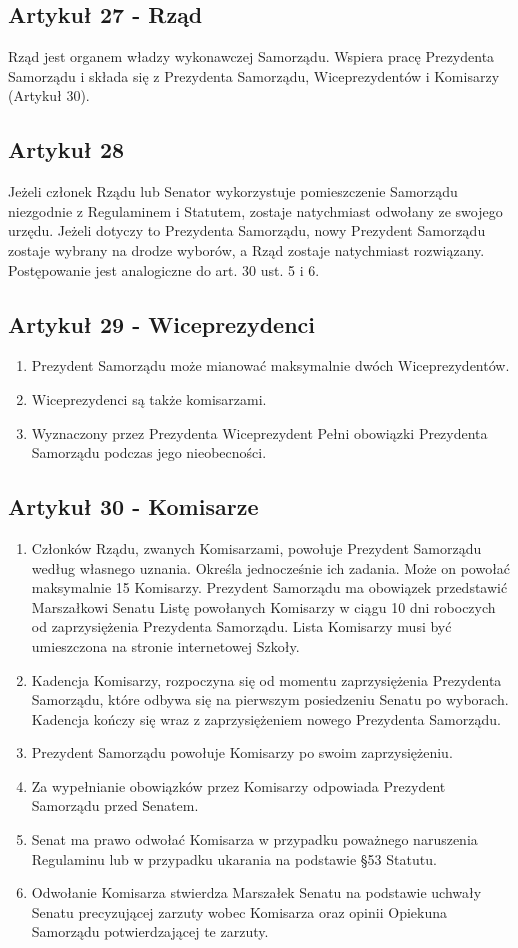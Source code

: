 \documentclass[14pt]{article}
\newenvironment{ustepy}{%
	\begin{enumerate}[leftmargin=1.5em, itemindent=1pt, labelwidth=1em, itemsep=5pt]
	}{%
	\end{enumerate}
}
\begin{document}
\subsection*{Artykuł 27 - Rząd}
Rząd jest organem władzy wykonawczej Samorządu. Wspiera pracę Prezydenta Samorządu i składa się z Prezydenta Samorządu, Wiceprezydentów i Komisarzy (Artykuł 30).

\subsection*{Artykuł 28}
Jeżeli członek Rządu lub Senator wykorzystuje pomieszczenie Samorządu niezgodnie z Regulaminem i Statutem, zostaje natychmiast odwołany ze swojego urzędu. Jeżeli dotyczy to Prezydenta Samorządu, nowy Prezydent Samorządu zostaje wybrany na drodze wyborów, a Rząd zostaje natychmiast rozwiązany. Postępowanie jest analogiczne do art. 30 ust. 5 i 6.

\subsection*{Artykuł 29 - Wiceprezydenci}
\begin{ustepy}
	\item Prezydent Samorządu może mianować maksymalnie dwóch Wiceprezydentów. 
	\item Wiceprezydenci są także komisarzami.
	\item Wyznaczony przez Prezydenta Wiceprezydent Pełni obowiązki Prezydenta Samorządu podczas jego nieobecności.
\end{ustepy}
\newpage
\subsection*{Artykuł 30 - Komisarze}
\begin{ustepy}
	\item Członków Rządu, zwanych Komisarzami, powołuje Prezydent Samorządu według własnego uznania. Określa jednocześnie ich zadania. Może on powołać maksymalnie 15 Komisarzy. Prezydent Samorządu ma obowiązek przedstawić Marszałkowi Senatu Listę powołanych Komisarzy w ciągu 10 dni roboczych od zaprzysiężenia Prezydenta Samorządu. Lista Komisarzy musi być umieszczona na stronie internetowej Szkoły.
	\item Kadencja Komisarzy, rozpoczyna się od momentu zaprzysiężenia Prezydenta Samorządu, które odbywa się na pierwszym posiedzeniu Senatu po wyborach. Kadencja kończy się wraz z zaprzysiężeniem nowego Prezydenta Samorządu.
	\item Prezydent Samorządu powołuje Komisarzy po swoim zaprzysiężeniu.
	\item Za wypełnianie obowiązków przez Komisarzy odpowiada Prezydent Samorządu przed Senatem.
	\item Senat ma prawo odwołać Komisarza w przypadku poważnego naruszenia Regulaminu lub w przypadku ukarania na podstawie §53 Statutu.
	\item Odwołanie Komisarza stwierdza Marszałek Senatu na podstawie uchwały Senatu precyzującej zarzuty wobec Komisarza oraz opinii Opiekuna Samorządu potwierdzającej te zarzuty.
\end{ustepy}
\end{document}
